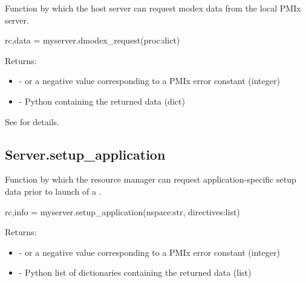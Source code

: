 \summary
Function by which the host server can request modex data from the local PMIx server.

\format

\pyspecificstart
\begin{codepar}
rc,data = myserver.dmodex_request(proc:dict)
\end{codepar}
\pyspecificend


\begin{arglist}
\end{arglist}

Returns:

\begin{itemize}
    \item {} -  or a negative value corresponding to a PMIx error constant (integer)
    \item {} - Python  containing the returned data (dict)
\end{itemize}

See  for details.


\subsection{Server.setup_application}

\summary
Function by which the resource manager can request application-specific setup data prior to launch of a .

\format

\pyspecificstart
\begin{codepar}
rc,info = myserver.setup_application(nspace:str, directives:list)
\end{codepar}
\pyspecificend


\begin{arglist}
\end{arglist}

Returns:

\begin{itemize}
    \item {} -  or a negative value corresponding to a PMIx error constant (integer)
    \item {} - Python list of  dictionaries containing the returned data (list)
\end{itemize}

